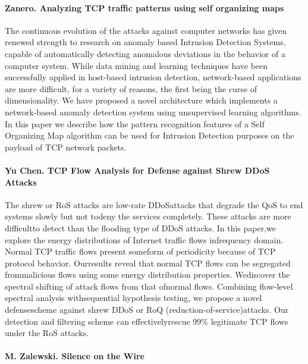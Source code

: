 \paragraph*{Zanero. Analyzing TCP traffic patterns using self organizing maps}
\cite{zanero2005analyzing}
The continuous evolution of the attacks against computer networks has given renewed strength to research on anomaly based Intrusion Detection Systems, capable of automatically detecting anomalous deviations in the behavior of a computer system. While data mining and learning techniques have been successfully applied in host-based intrusion detection, network-based applications are more difficult, for a variety of reasons, the first being the curse of dimensionality. We have proposed a novel architecture which implements a network-based anomaly detection system using unsupervised learning algorithms. In this paper we describe how the pattern recognition features of a Self Organizing Map algorithm can be used for Intrusion Detection purposes on the payload of TCP network packets.

\paragraph*{Yu Chen. TCP Flow Analysis for Defense against Shrew DDoS Attacks}
The shrew or RoS attacks are low-rate DDoSattacks that degrade the QoS to end systems slowly but not todeny the services completely. These attacks are more difficultto detect than the flooding type of DDoS attacks. In this paper,we explore the energy distributions of Internet traffic flows infrequency domain. Normal TCP traffic flows present someform of periodicity because of TCP protocol behavior. Ourresults reveal that normal TCP flows can be segregated frommalicious flows using some energy distribution properties. Wediscover the spectral shifting of attack flows from that ofnormal flows. Combining flow-level spectral analysis withsequential hypothesis testing, we propose a novel defensescheme against shrew DDoS or RoQ (reduction-of-service)attacks. Our detection and filtering scheme can effectivelyrescue 99\% legitimate TCP flows under the RoS attacks.

\paragraph*{M. Zalewski. Silence on the Wire}
\cite{zalewski2005silence}
\cite{zalewski2005silence10}
\cite{zalewski2005silence11}

